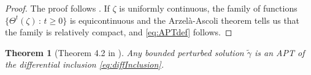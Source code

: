 \documentclass{article}
\newtheorem{theorem}{Theorem}
\begin{document}
\begin{proof}
    The proof follows \cite{benaim2005stochastic}. If $\zeta$ is uniformly continuous, the family of functions $\{ \Theta^t(\zeta)\,:\,t\geq 0\}$ is equicontinuous and the Arzel\`a-Ascoli theorem tells us that the family is relatively compact, and \eqref{eq:APTdef} follows. 
    

\end{proof}

\begin{theorem}[Theorem 4.2 in \cite{benaim2005stochastic}]\label{th:pert-APT}
    Any bounded perturbed solution $\tilde\gamma$ is an APT of the differential inclusion \eqref{eq:diffInclusion}.
\end{theorem}
\end{document}
